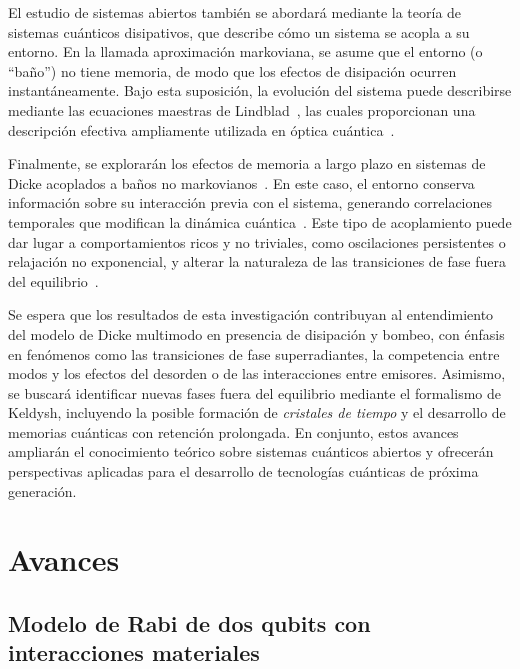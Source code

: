 \documentclass[onecolumn,notitlepage,letterpaper,aps,pra,12pt]{article}
\numberwithin{equation}{section}
\begin{document}
El estudio de sistemas abiertos también se abordará mediante la teoría de sistemas cuánticos disipativos, que describe cómo un sistema se acopla a su entorno. En la llamada aproximación markoviana, se asume que el entorno (o “baño”) no tiene memoria, de modo que los efectos de disipación ocurren instantáneamente. Bajo esta suposición, la evolución del sistema puede describirse mediante las ecuaciones maestras de Lindblad~\cite{breuer2003,Lindblad1976}, las cuales proporcionan una descripción efectiva ampliamente utilizada en óptica cuántica~\cite{weiss2012}.

Finalmente, se explorarán los efectos de memoria a largo plazo en sistemas de Dicke acoplados a baños no markovianos~\cite{zhu2019,lundgren2020,fiorelli2020}. En este caso, el entorno conserva información sobre su interacción previa con el sistema, generando correlaciones temporales que modifican la dinámica cuántica~\cite{orazio2016}. Este tipo de acoplamiento puede dar lugar a comportamientos ricos y no triviales, como oscilaciones persistentes o relajación no exponencial, y alterar la naturaleza de las transiciones de fase fuera del equilibrio~\cite{lundgren2020}.

Se espera que los resultados de esta investigación contribuyan al entendimiento del modelo de Dicke multimodo en presencia de disipación y bombeo, con énfasis en fenómenos como las transiciones de fase superradiantes, la competencia entre modos y los efectos del desorden o de las interacciones entre emisores. Asimismo, se buscará identificar nuevas fases fuera del equilibrio mediante el formalismo de Keldysh, incluyendo la posible formación de \textit{cristales de tiempo} y el desarrollo de memorias cuánticas con retención prolongada. En conjunto, estos avances ampliarán el conocimiento teórico sobre sistemas cuánticos abiertos y ofrecerán perspectivas aplicadas para el desarrollo de tecnologías cuánticas de próxima generación.


\section{Avances}


\subsection{Modelo de Rabi de dos qubits con interacciones materiales}
\end{document}
